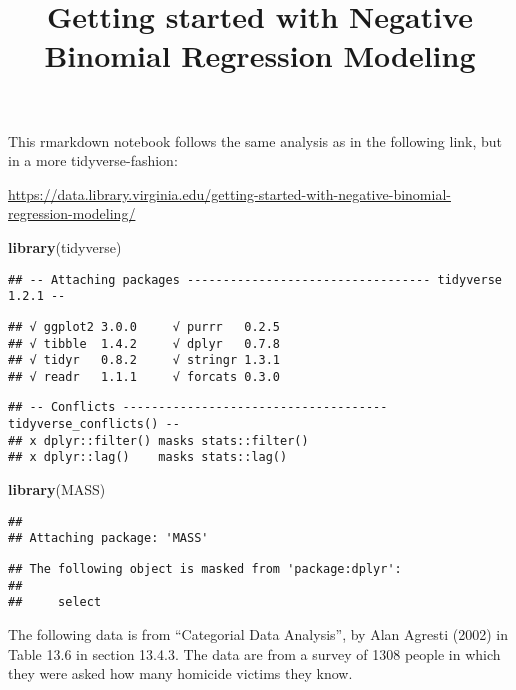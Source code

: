 \documentclass[]{article}
\title{Getting started with Negative Binomial Regression Modeling}
\author{}
\date{}
\newenvironment{Shaded}{\begin{snugshade}}{\end{snugshade}}
\newcommand{\KeywordTok}[1]{\textcolor[rgb]{0.13,0.29,0.53}{\textbf{{#1}}}}
\newcommand{\NormalTok}[1]{{#1}}
\begin{document}
\maketitle

This rmarkdown notebook follows the same analysis as in the following
link, but in a more tidyverse-fashion:

\url{https://data.library.virginia.edu/getting-started-with-negative-binomial-regression-modeling/}

\begin{Shaded}
\begin{Highlighting}[]
\KeywordTok{library}\NormalTok{(tidyverse)}
\end{Highlighting}
\end{Shaded}

\begin{verbatim}
## -- Attaching packages ---------------------------------- tidyverse 1.2.1 --
\end{verbatim}

\begin{verbatim}
## √ ggplot2 3.0.0     √ purrr   0.2.5
## √ tibble  1.4.2     √ dplyr   0.7.8
## √ tidyr   0.8.2     √ stringr 1.3.1
## √ readr   1.1.1     √ forcats 0.3.0
\end{verbatim}

\begin{verbatim}
## -- Conflicts ------------------------------------- tidyverse_conflicts() --
## x dplyr::filter() masks stats::filter()
## x dplyr::lag()    masks stats::lag()
\end{verbatim}

\begin{Shaded}
\begin{Highlighting}[]
\KeywordTok{library}\NormalTok{(MASS)}
\end{Highlighting}
\end{Shaded}

\begin{verbatim}
## 
## Attaching package: 'MASS'
\end{verbatim}

\begin{verbatim}
## The following object is masked from 'package:dplyr':
## 
##     select
\end{verbatim}

The following data is from ``Categorial Data Analysis'', by Alan Agresti
(2002) in Table 13.6 in section 13.4.3. The data are from a survey of
1308 people in which they were asked how many homicide victims they
know.
\end{document}
